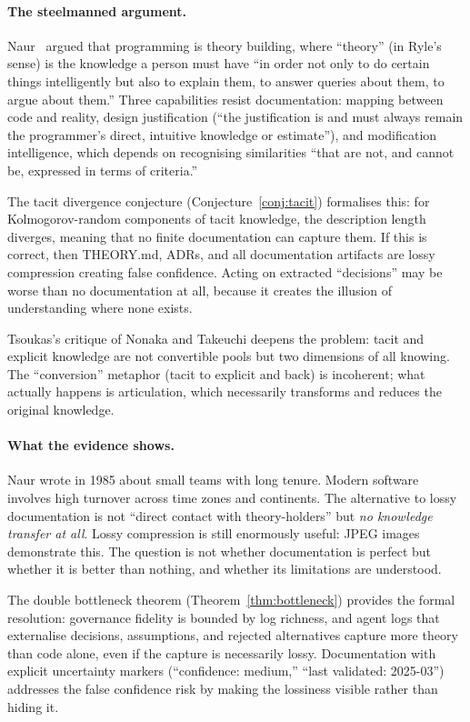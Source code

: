 \paragraph{The steelmanned argument.}
Naur~\citep{naur1985} argued that programming is theory building, where ``theory'' (in Ryle's sense) is the knowledge a person must have ``in order not only to do certain things intelligently but also to explain them, to answer queries about them, to argue about them.'' Three capabilities resist documentation: mapping between code and reality, design justification (``the justification is and must always remain the programmer's direct, intuitive knowledge or estimate''), and modification intelligence, which depends on recognising similarities ``that are not, and cannot be, expressed in terms of criteria.''

The tacit divergence conjecture (Conjecture~\ref{conj:tacit}) formalises this: for Kolmogorov-random components of tacit knowledge, the description length diverges, meaning that no finite documentation can capture them. If this is correct, then THEORY.md, ADRs, and all documentation artifacts are lossy compression creating false confidence. Acting on extracted ``decisions'' may be worse than no documentation at all, because it creates the illusion of understanding where none exists.

Tsoukas's critique of Nonaka and Takeuchi deepens the problem: tacit and explicit knowledge are not convertible pools but two dimensions of all knowing. The ``conversion'' metaphor (tacit to explicit and back) is incoherent; what actually happens is articulation, which necessarily transforms and reduces the original knowledge.

\paragraph{What the evidence shows.}
Naur wrote in 1985 about small teams with long tenure. Modern software involves high turnover across time zones and continents. The alternative to lossy documentation is not ``direct contact with theory-holders'' but \emph{no knowledge transfer at all}. Lossy compression is still enormously useful: JPEG images demonstrate this. The question is not whether documentation is perfect but whether it is better than nothing, and whether its limitations are understood.

The double bottleneck theorem (Theorem~\ref{thm:bottleneck}) provides the formal resolution: governance fidelity is bounded by log richness, and agent logs that externalise decisions, assumptions, and rejected alternatives capture more theory than code alone, even if the capture is necessarily lossy. Documentation with explicit uncertainty markers (``confidence: medium,'' ``last validated: 2025-03'') addresses the false confidence risk by making the lossiness visible rather than hiding it.

